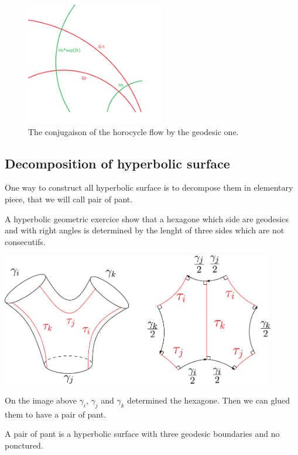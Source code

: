 \begin{figure}[h!]
\centering
\includegraphics[width=6cm]{Image/Commutatoin.png}
\caption{The conjugaison of the horocycle flow by the geodesic one.}
\end{figure}


\subsection{Decomposition of hyperbolic surface}

One way to construct all hyperbolic surface is to decompose them in elementary piece, that we will call pair of pant.

A hyperbolic geometric exercice show that a hexagone which side are geodesics and with right angles is determined by the lenght of three sides which are not consecutifs.

\begin{center}
\includegraphics[width=12cm]{Image/PairOfPant.jpg}
\end{center}

 On the image above $\gamma_i$, $\gamma_j$ and $\gamma_k$ determined the hexagone. Then we can glued them to have a pair of pant.

 \begin{dfnt}
 A pair of pant is a hyperbolic surface with three geodesic boundaries and no ponctured.
 \end{dfnt}

